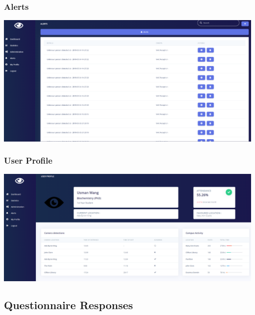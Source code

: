 \documentclass[
  english,
  a4paper,
,tablecaptionabove
]{scrartcl}
\begin{document}
\hypertarget{alerts}{%
\subsubsection{Alerts}\label{alerts}}

\includegraphics{images/ppm-images/alerts.png} \newpage

\hypertarget{user-profile-1}{%
\subsubsection{User Profile}\label{user-profile-1}}

\includegraphics{images/ppm-images/user-profile.png} \newpage

\hypertarget{questionnaire-responses}{%
\subsection{Questionnaire Responses}\label{questionnaire-responses}}
\end{document}
